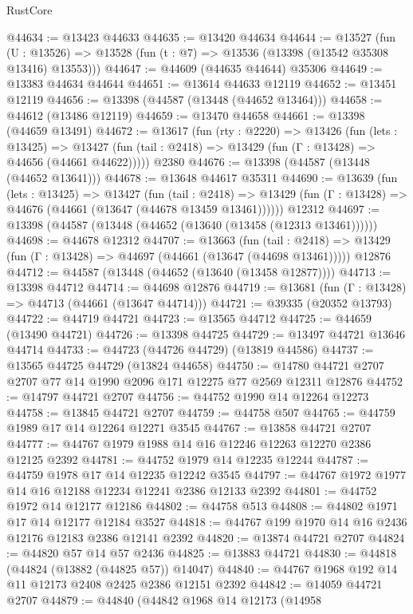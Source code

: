 \begin{lexlean}{RustCore}
\begin{coremodule}
@44634 := @13423 @44633
@44635 := @13420 @44634
@44644 := @13527
    (fun (U : @13526) => @13528 (fun (t : @7) => @13536 (@13398 (@13542 @35308 @13416) @13553)))
@44647 := @44609 (@44635 @44644) @35306
@44649 := @13383 @44634 @44644
@44651 := @13614 @44633 @12119
@44652 := @13451 @12119
@44656 := @13398 (@44587 (@13448 (@44652 @13464)))
@44658 := @44612 (@13486 @12119)
@44659 := @13470 @44658
@44661 := @13398 (@44659 @13491)
@44672 := @13617
    (fun (rty : @2220) =>
    @13426
      (fun (lets : @13425) =>
      @13427 (fun (tail : @2418) => @13429 (fun (Γ : @13428) => @44656 (@44661 @44622)))))
    @2380
@44676 := @13398 (@44587 (@13448 (@44652 @13641)))
@44678 := @13648 @44617 @35311
@44690 := @13639
    (fun (lets : @13425) =>
    @13427
      (fun (tail : @2418) =>
      @13429 (fun (Γ : @13428) => @44676 (@44661 (@13647 (@44678 @13459 @13461))))))
    @12312
@44697 := @13398 (@44587 (@13448 (@44652 (@13640 (@13458 (@12313 @13461))))))
@44698 := @44678 @12312
@44707 := @13663
    (fun (tail : @2418) => @13429 (fun (Γ : @13428) => @44697 (@44661 (@13647 (@44698 @13461)))))
    @12876
@44712 := @44587 (@13448 (@44652 (@13640 (@13458 @12877))))
@44713 := @13398 @44712
@44714 := @44698 @12876
@44719 := @13681 (fun (Γ : @13428) => @44713 (@44661 (@13647 @44714)))
@44721 := @39335 (@20352 @13793)
@44722 := @44719 @44721
@44723 := @13565 @44712
@44725 := @44659 (@13490 @44721)
@44726 := @13398 @44725
@44729 := @13497 @44721 @13646 @44714
@44733 := @44723 (@44726 @44729) (@13819 @44586)
@44737 := @13565 @44725 @44729 (@13824 @44658)
@44750 := @14780 @44721 @2707 @2707 @77 @14 @1990 @2096 @171 @12275 @77 @2569 @12311 @12876
@44752 := @14797 @44721 @2707
@44756 := @44752 @1990 @14 @12264 @12273
@44758 := @13845 @44721 @2707
@44759 := @44758 @507
@44765 := @44759 @1989 @17 @14 @12264 @12271 @3545
@44767 := @13858 @44721 @2707
@44777 := @44767 @1979 @1988 @14 @16 @12246 @12263 @12270 @2386 @12125 @2392
@44781 := @44752 @1979 @14 @12235 @12244
@44787 := @44759 @1978 @17 @14 @12235 @12242 @3545
@44797 := @44767 @1972 @1977 @14 @16 @12188 @12234 @12241 @2386 @12133 @2392
@44801 := @44752 @1972 @14 @12177 @12186
@44802 := @44758 @513
@44808 := @44802 @1971 @17 @14 @12177 @12184 @3527
@44818 := @44767 @199 @1970 @14 @16 @2436 @12176 @12183 @2386 @12141 @2392
@44820 := @13874 @44721 @2707
@44824 := @44820 @57 @14 @57 @2436
@44825 := @13883 @44721
@44830 := @44818 (@44824 (@13882 (@44825 @57)) @14047)
@44840 := @44767 @1968 @192 @14 @11 @12173 @2408 @2425 @2386 @12151 @2392
@44842 := @14059 @44721 @2707
@44879 := @44840
    (@44842
      @1968
      @14
      @12173
      (@14958

\end{coremodule}
\end{lexlean}
